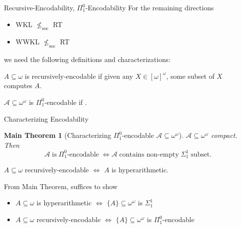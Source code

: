 \begin{frame}{Recursive-Encodability, $\Pi_1^0$-Encodability}
  For the remaining directions
  \begin{itemize}
    \item WKL $\nleq_{\text{soc}}$ RT
    \item WWKL $\nleq_{\text{soc}}$ RT
  \end{itemize}

  we need the following definitions and characterizations:
  \vspace{1em}

  \begin{define}
    $A\subseteq\omega$ is recursively-encodable if given any
    $X\in[\omega]^\omega$, some subset of $X$ computes $A$.
  \end{define}

  \begin{define}
    $\mathcal{A}\subseteq \omega^{\omega}$ is $\Pi_1^0$-encodable if
    .
  \end{define}
\end{frame}

\begin{frame}{Characterizing Encodability}
  \newtheorem*{main-thm*}{Main Theorem}
  \begin{main-thm*}[Characterizing $\Pi_1^0$-encodable
  $\mathcal{A}\subseteq\omega^\omega$]
    $\mathcal{A}\subseteq \omega^{\omega}$ compact. Then
    \[\mathcal{A}\; \text{is}\; \Pi_1^0\text{-encodable}\; \Leftrightarrow
    \mathcal{A}\; \text{contains non-empty}\; \Sigma_1^1\; \text{subset}.\]
  \end{main-thm*}

  \begin{coro*}
    $A\subseteq\omega$ recursively-encodable $\Leftrightarrow$ $A$ is
    hyperarithmetic.
  \end{coro*}

  \vspace{1em}
  From Main Theorem, suffices to show
  \begin{itemize}
    \item $A\subseteq\omega$ is hyperarithmetic $\Leftrightarrow$
      $\{A\}\subseteq\omega^\omega$ is $\Sigma_1^1$
    \item $A\subseteq\omega$ recursively-encodable $\Leftrightarrow$
      $\{A\}\subseteq\omega^\omega$ is $\Pi_1^0$-encodable
  \end{itemize}
\end{frame}

